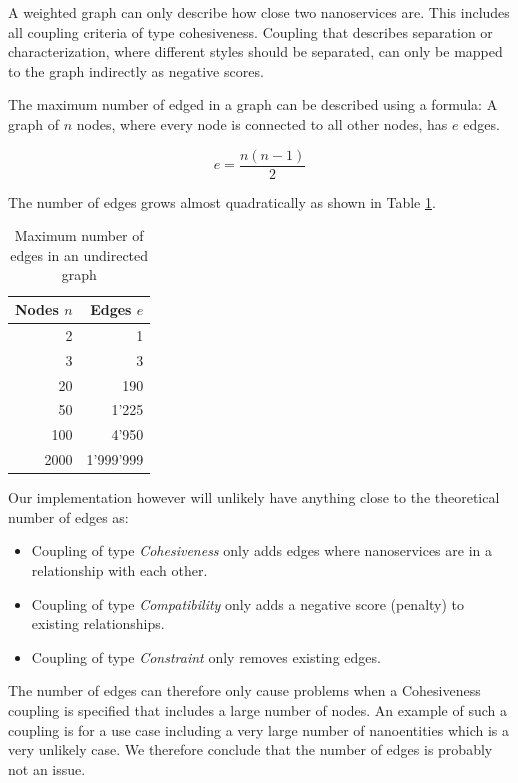 A weighted graph can only describe how close two nanoservices are. This includes all coupling criteria of type cohesiveness. Coupling that describes separation or characterization, where different styles should be separated, can only be mapped to the graph indirectly as negative scores. %

The maximum number of edged in a graph can be described using a formula: A graph of $n$ nodes, where every node is connected to all other nodes, has $e$ edges.

\begin{displaymath}
e = \frac{n(n-1)}{2}
\end{displaymath}

The number of edges grows almost quadratically as shown in Table \ref{tab:edgesCount}.

\begin{table}[H]
	\centering
	\caption{Maximum number of edges in an undirected graph}
	\label{tab:edgesCount}
	\begin{tabular}{|r|r|}
	\hline \textbf{Nodes} $n$ & \textbf{Edges} $e$ \\ 
	\hline 2 & 1 \\ 
	\hline 3 & 3 \\ 
	\hline 20 & 190 \\ 
	\hline 50 & 1'225 \\ 
	\hline 100 & 4'950 \\ 
	\hline 2000 & 1'999'999 \\ 
	\hline 
	\end{tabular} 
\end{table}

Our implementation however will unlikely have anything close to the theoretical number of edges as:
\begin{itemize}
\item Coupling of type \textit{Cohesiveness} only adds edges where nanoservices are in a relationship with each other.
\item Coupling of type \textit{Compatibility} only adds a negative score (penalty) to existing relationships.
\item Coupling of type \textit{Constraint} only removes existing edges.
\end{itemize}

The number of edges can therefore only cause problems when a Cohesiveness coupling is specified that includes a large number of nodes. An example of such a coupling is for a use case including a very large number of nanoentities which is a very unlikely case. We therefore conclude that the number of edges is probably not an issue.



